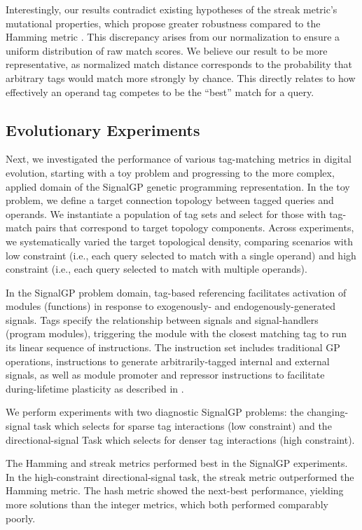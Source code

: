Interestingly, our results contradict existing hypotheses of the streak metric's mutational properties, which propose greater robustness compared to the Hamming metric \citep{downing2015intelligence}.
This discrepancy arises from our normalization to ensure a uniform distribution of raw match scores.
We believe our result to be more representative, as normalized match distance corresponds to the probability that arbitrary tags would match more strongly by chance.
This directly relates to how effectively an operand tag competes to be the ``best'' match for a query.

\subsection{Evolutionary Experiments}

Next, we investigated the performance of various tag-matching metrics in digital evolution, starting with a toy problem and progressing to the more complex, applied domain of the SignalGP genetic programming representation.
In the toy problem, we define a target connection topology between tagged queries and operands.
We instantiate a population of tag sets and select for those with tag-match pairs that correspond to target topology components.
Across experiments, we systematically varied the target topological density, comparing scenarios with low constraint (i.e., each query selected to match with a single operand) and high constraint (i.e., each query selected to match with multiple operands).

In the SignalGP problem domain, tag-based referencing facilitates activation of modules (functions) in response to exogenously- and endogenously-generated signals.
Tags specify the relationship between signals and signal-handlers (program modules), triggering the module with the closest matching tag to run its linear sequence of instructions.
The instruction set includes traditional GP operations, instructions to generate arbitrarily-tagged internal and external signals, as well as module promoter and repressor instructions to facilitate during-lifetime plasticity as described in \cite{lalejini2021tag}.

We perform experiments with two diagnostic SignalGP problems: the changing-signal task which selects for sparse tag interactions (low constraint) and the directional-signal Task which selects for denser tag interactions (high constraint).

The Hamming and streak metrics performed best in the SignalGP experiments.
In the high-constraint directional-signal task, the streak metric outperformed the Hamming metric.
The hash metric showed the next-best performance, yielding more solutions than the integer metrics, which both performed comparably poorly.

